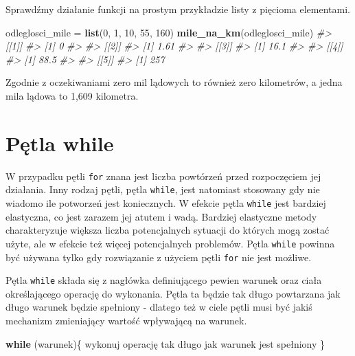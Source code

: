 \documentclass[paper=6in:9in,pagesize=pdftex,headinclude=on,footinclude=on,10pt]{scrbook}
\newenvironment{Shaded}{\begin{snugshade}}{\end{snugshade}}
\newcommand{\CommentTok}[1]{\textcolor[rgb]{0.56,0.35,0.01}{\textit{#1}}}
\newcommand{\ControlFlowTok}[1]{\textcolor[rgb]{0.13,0.29,0.53}{\textbf{#1}}}
\newcommand{\DecValTok}[1]{\textcolor[rgb]{0.00,0.00,0.81}{#1}}
\newcommand{\KeywordTok}[1]{\textcolor[rgb]{0.13,0.29,0.53}{\textbf{#1}}}
\newcommand{\NormalTok}[1]{#1}
\newcommand{\StringTok}[1]{\textcolor[rgb]{0.31,0.60,0.02}{#1}}
\begin{document}
Sprawdźmy działanie funkcji na prostym przykładzie listy z pięcioma elementami.

\begin{Shaded}
\begin{Highlighting}[]
\NormalTok{odleglosci_mile =}\StringTok{ }\KeywordTok{list}\NormalTok{(}\DecValTok{0}\NormalTok{, }\DecValTok{1}\NormalTok{, }\DecValTok{10}\NormalTok{, }\DecValTok{55}\NormalTok{, }\DecValTok{160}\NormalTok{)}
\KeywordTok{mile_na_km}\NormalTok{(odleglosci_mile)}
\CommentTok{#> [[1]]}
\CommentTok{#> [1] 0}
\CommentTok{#> }
\CommentTok{#> [[2]]}
\CommentTok{#> [1] 1.61}
\CommentTok{#> }
\CommentTok{#> [[3]]}
\CommentTok{#> [1] 16.1}
\CommentTok{#> }
\CommentTok{#> [[4]]}
\CommentTok{#> [1] 88.5}
\CommentTok{#> }
\CommentTok{#> [[5]]}
\CommentTok{#> [1] 257}
\end{Highlighting}
\end{Shaded}

Zgodnie z oczekiwaniami zero mil lądowych to również zero kilometrów, a jedna mila lądowa to 1,609 kilometra.

\hypertarget{petla-while}{%
\section{Pętla while}\label{petla-while}}

W przypadku pętli \texttt{for} znana jest liczba powtórzeń przed rozpoczęciem jej działania.
Inny rodzaj pętli, pętla \texttt{while}, jest natomiast stosowany gdy nie wiadomo ile potworzeń jest koniecznych.
W efekcie pętla \texttt{while} jest bardziej elastyczna, co jest zarazem jej atutem i wadą.
Bardziej elastyczne metody charakteryzuje większa liczba potencjalnych sytuacji do których mogą zostać użyte, ale w efekcie też więcej potencjalnych problemów.
Pętla \texttt{while} powinna być używana tylko gdy rozwiązanie z użyciem pętli \texttt{for} nie jest możliwe.

Pętla \texttt{while} składa się z nagłówka definiującego pewien warunek oraz ciała określającego operację do wykonania.
Pętla ta będzie tak długo powtarzana jak długo warunek będzie spełniony - dlatego też w ciele pętli musi być jakiś mechanizm zmieniający wartość wpływającą na warunek.

\begin{Shaded}
\begin{Highlighting}[]
\ControlFlowTok{while}\NormalTok{ (warunek)\{}
\NormalTok{    wykonuj operację tak długo jak warunek jest spełniony}
\NormalTok{\}}
\end{Highlighting}
\end{Shaded}
\end{document}
